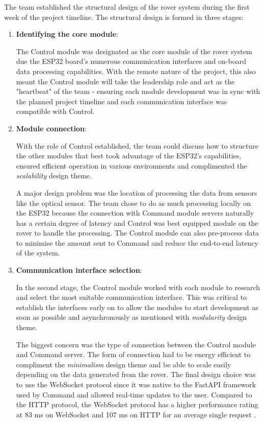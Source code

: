 \documentclass[11pt, a4paper]{article}
\begin{document}
The team established the structural design of the rover system during the first week of the project timeline. The structural design is formed in three stages: 

\begin{enumerate}

    \item \textbf{Identifying the core module}: 
    
    The Control module was designated as the core module of the rover system due the ESP32 board's numerous communication interfaces and on-board data processing capabilities. With the remote nature of the project, this also meant the Control module will take the leadership role and act as the "heartbeat" of the team - ensuring each module development was in sync with the planned project timeline and each communication interface was compatible with Control.   

    \item \textbf{Module connection}:
    
    With the role of Control established, the team could discuss how to structure the other modules that best took advantage of the ESP32's capabilities, ensured efficient operation in various environments and complimented the \textit{scalability} design theme. 

    A major design problem was the location of processing the data from sensors like the optical sensor. The team chose to do as much processing locally on the ESP32 because the connection with Command module servers naturally has a certain degree of latency and Control was best equipped module on the rover to handle the processing. The Control module can also pre-process data to minimise the amount sent to Command and reduce the end-to-end latency of the system.
    
    \item \textbf{Communication interface selection}: 
    
    In the second stage, the Control module worked with each module to research and select the most suitable communication interface. This was critical to establish the interfaces early on to allow the modules to start development as soon as possible and asynchronously as mentioned with \textit{modularity} design theme. 

    The biggest concern was the type of connection between the Control module and Command server. The form of connection had to be energy efficient to compliment the \textit{minimalism} design theme and be able to scale easily depending on the data generated from the rover. The final design choice was to use the WebSocket protocol since it was native to the FastAPI framework used by Command and allowed real-time updates to the user. Compared to the HTTP protocol, the WebSocket protocol has a higher performance rating at 83 ms on WebSocket and 107 ms on HTTP for an average single request \cite{SocketvsHTTP}.  

\end{enumerate}  
\end{document}
